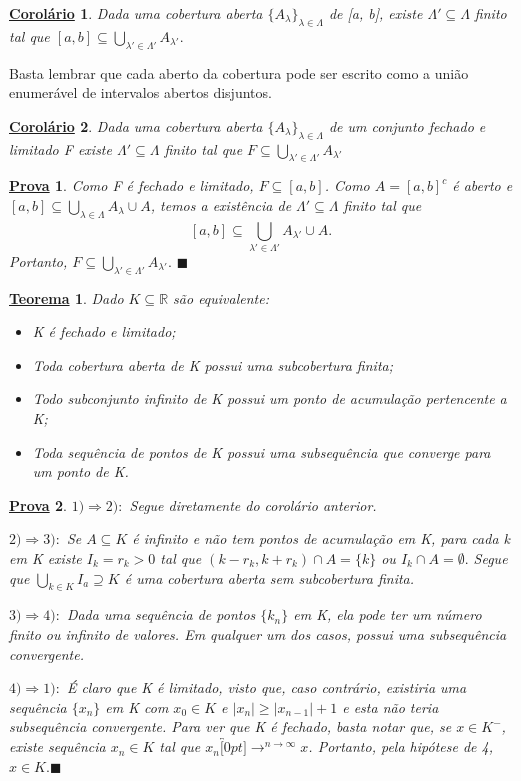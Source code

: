 \documentclass{article}
\newtheorem*{theorem*}{\underline{Teorema}}
\newtheorem*{proof*}{\underline{Prova}}
\newtheorem*{crl*}{\underline{Corol\'ario}}
\renewcommand\qedsymbol{$\blacksquare$}
\begin{document}
\begin{crl*}
  Dada uma cobertura aberta $\{A_{\lambda }\}_{\lambda \in\Lambda }$ de [a, b], existe $\Lambda '\subseteq{\Lambda }$ finito
  tal que $[a,b]\subseteq{\bigcup_{\lambda '\in\Lambda '}^{}{A_{\lambda'}}}.$
\end{crl*}
  Basta lembrar que cada aberto da cobertura pode ser escrito como a união enumerável de intervalos abertos disjuntos.
 \begin{crl*}
   Dada uma cobertura aberta $\{A_{\lambda }\}_{\lambda \in\Lambda }$ de um conjunto fechado e limitado F existe $\Lambda '\subseteq{\Lambda }$
   finito tal que $F\subseteq{\bigcup_{\lambda '\in\Lambda '}^{}{A_{\lambda '}}}$
 \end{crl*}
 \begin{proof*}
   Como F é fechado e limitado, $F\subseteq{[a,b]}$. Como $A=[a,b]^{c}$ é aberto e $[a,b]\subseteq{\bigcup_{\lambda \in\Lambda }^{}{A_{\lambda }}\cup{A}}$, temos
   a existência de $\Lambda '\subseteq{\Lambda }$ finito tal que 
     $$
     [a,b] \subseteq{\bigcup_{\lambda '\in\Lambda '}^{}{A_{\lambda '}}\cup{A}}.
     $$
     Portanto, $F\subseteq{\bigcup_{\lambda '\in\Lambda '}^{}{A_{\lambda '}}}.$ \qedsymbol
 \end{proof*}
 \begin{theorem*}
   Dado $K\subseteq{\mathbb{R}}$ são equivalente: 
  \begin{itemize}
    \item[1)] K é fechado e limitado;
    \item[2)] Toda cobertura aberta de K possui uma subcobertura finita;
    \item[3)] Todo subconjunto infinito de K possui um ponto de acumulação pertencente a K;
    \item[4)] Toda sequência de pontos de K possui uma subsequência que converge para um ponto de K.
  \end{itemize}
 \end{theorem*}
\begin{proof*}
  $1) \Rightarrow 2):$ Segue diretamente do corolário anterior.

  $2) \Rightarrow 3):$ Se $A\subseteq{K}$ é infinito e não tem pontos de acumulação em K, para cada k em K existe $I_{k}=r_{k} > 0$
  tal que $(k-r_{k}, k+r_{k})\cap{A} = \{k\}$ ou  $I_{k}\cap A = \emptyset.$ Segue que $\bigcup_{k\in K}^{}{I_{a}}\supseteq{K}$ é
  uma cobertura aberta sem subcobertura finita.

  $3) \Rightarrow 4):$ Dada uma sequência de pontos $\{k_{n}\}$ em K, ela pode ter um número finito ou infinito de valores.
  Em qualquer um dos casos, possui uma subsequência convergente.

  $4) \Rightarrow 1):$ É claro que K é limitado, visto que, caso contrário, existiria uma sequência $\{x_{n}\}$ em K com $x_{0}\in K$
  e $|x_{n}|\geq |x_{n-1}| + 1$ e esta não teria subsequência convergente. Para ver que K é fechado, basta notar que, se $x\in K^{-}$,
  existe sequência $x_{n}\in K$ tal que $x_{n}\overbracket[0pt]{\longrightarrow}^{n\to \infty}x$. Portanto, pela hipótese de 4, $x\in K.$\qedsymbol
\end{proof*}
\end{document}
